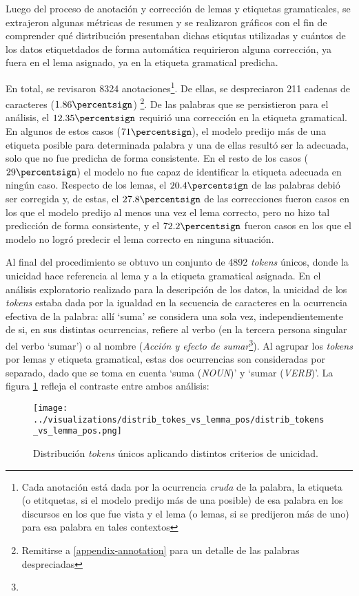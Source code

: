 Luego del proceso de anotación y corrección de lemas y etiquetas gramaticales,
se extrajeron algunas métricas de resumen y se realizaron gráficos con el fin de
comprender qué distribución presentaban dichas etiqutas utilizadas y cuántos de los
datos etiquetdados de forma automática requirieron alguna corrección, ya fuera en el
lema asignado, ya en la etiqueta gramatical predicha.
\par
En total, se revisaron 8324 anotaciones\footnote{Cada anotación está dada por
la ocurrencia \textit{cruda} de la palabra, la etiqueta (o etitquetas, si el modelo
predijo más de una posible) de esa palabra en los discursos en los que fue vista y el
lema (o lemas, si se predijeron más de uno) para esa palabra en tales contextos}.
De ellas, se despreciaron 211 cadenas de caracteres ($1.86\percentsign$)
\footnote{Remitirse a \ref{appendix-annotation} para un detalle de las palabras
despreciadas}. De las palabras que se persistieron para el análisis,
el $12.35\percentsign$ requirió una corrección en la etiqueta gramatical.
En algunos de estos casos ($71\percentsign$), el modelo predijo más de una etiqueta
posible para determinada palabra y una de ellas resultó ser la adecuada, solo que no
fue predicha de forma consistente. En el resto de los casos ($29\percentsign$)
el modelo no fue capaz de identificar la etiqueta adecuada en ningún caso.
Respecto de los lemas, el $20.4\percentsign$ de las palabras debió ser corregida
y, de estas, el $27.8\percentsign$ de las correcciones fueron casos en los que el
modelo predijo al menos una vez el lema correcto, pero no hizo tal predicción de
forma consistente, y el $72.2\percentsign$ fueron casos en los que el modelo
no logró predecir el lema correcto en ninguna situación.
\par
Al final del procedimiento se obtuvo un conjunto de 4892 \textit{tokens} únicos,
donde la unicidad hace referencia al lema y a la etiqueta gramatical asignada.
En el análisis exploratorio realizado para la descripción de los datos, la unicidad
de los \textit{tokens} estaba dada por la igualdad en la secuencia de caracteres
en la ocurrencia efectiva de la palabra: allí `suma' se considera
una sola vez, independientemente de si, en sus distintas ocurrencias, refiere al
verbo (en la tercera persona singular del verbo `sumar') o al nombre
(\textit{Acción y efecto de sumar}\footnote{}). Al
agrupar los \textit{tokens} por lemas y etiqueta gramatical, estas dos
ocurrencias son consideradas por separado, dado que se toma en cuenta
`suma (\textit{NOUN})' y `sumar (\textit{VERB})'. La figura
\ref{fig-distrib-unique-tokens} refleja el contraste entre ambos análisis:

\begin{figure}[h!]
\centering
\texttt{[image: ../visualizations/distrib\_tokes\_vs\_lemma\_pos/distrib\_tokens\_vs\_lemma\_pos.png]}
\caption{Distribución \textit{tokens} únicos aplicando distintos criterios de unicidad.}
\label{fig-distrib-unique-tokens}
\end{figure}